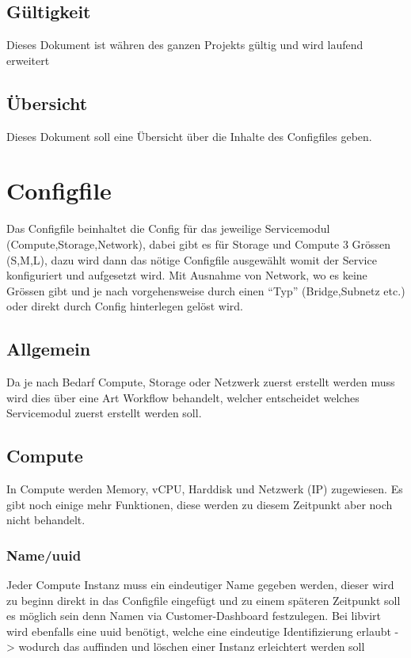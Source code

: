\documentclass[11pt]{scrartcl}
\begin{document}
\subsection{Gültigkeit}
Dieses Dokument ist währen des ganzen Projekts gültig und wird laufend erweitert
\subsection{Übersicht}
Dieses Dokument soll eine Übersicht über die Inhalte des Configfiles geben.

\section{Configfile}
Das Configfile beinhaltet die Config für das jeweilige Servicemodul 
(Compute,Storage,Network), dabei gibt es für Storage und Compute 3 Grössen 
(S,M,L), dazu wird dann das nötige Configfile ausgewählt womit der Service 
konfiguriert und aufgesetzt wird.
Mit Ausnahme von Network, wo es keine Grössen gibt und  je nach vorgehensweise 
durch einen ``Typ'' (Bridge,Subnetz etc.) oder direkt durch Config hinterlegen gelöst wird.

\subsection{Allgemein}
Da je nach Bedarf Compute, Storage oder Netzwerk zuerst erstellt werden muss 
wird dies über eine Art Workflow behandelt, welcher entscheidet welches
Servicemodul zuerst erstellt werden soll.

\subsection{Compute}
In Compute werden Memory, vCPU, Harddisk und Netzwerk (IP) zugewiesen.
Es gibt noch einige mehr Funktionen, diese werden zu diesem Zeitpunkt aber noch 
nicht behandelt.

\subsubsection{Name/uuid}
Jeder Compute Instanz muss ein eindeutiger Name gegeben werden, dieser wird zu 
beginn direkt in das Configfile eingefügt und zu einem späteren Zeitpunkt soll 
es möglich sein denn Namen via Customer-Dashboard festzulegen.
Bei libvirt wird ebenfalls eine uuid benötigt, welche eine eindeutige 
Identifizierung erlaubt -> wodurch das auffinden und löschen einer Instanz 
erleichtert werden soll
\end{document}
